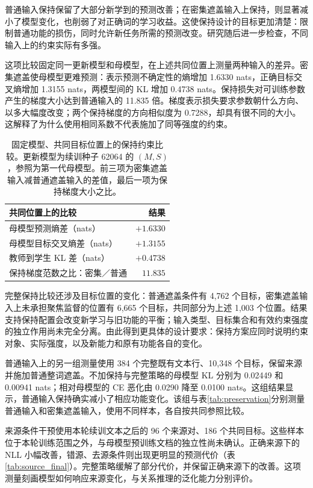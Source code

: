 普通输入保持保留了大部分新学到的预测改善；在密集遮盖输入上保持，则显著减小了模型变化，也削弱了对正确词的学习收益。这使保持设计的目标更加清楚：限制普通功能的损伤，同时允许新任务所需的预测改变。研究随后进一步检查，不同输入上的约束实际有多强。

这项比较固定同一更新模型和母模型，在上述共同位置上测量两种输入的差异。密集遮盖使母模型更难预测：表示预测不确定性的熵增加 1.6330 nats，正确目标交叉熵增加 1.3155 nats，两模型间的 KL 增加 0.4738 nats。保持损失对可训练参数产生的梯度大小达到普通输入的 11.835 倍。梯度表示损失要求参数朝什么方向、以多大幅度改变；两个保持梯度的方向相似度为 0.7288，却具有很不同的大小。这解释了为什么使用相同系数不代表施加了同等强度的约束。

\begin{table}[htbp]
\caption{固定模型、共同目标位置上的保持约束比较。更新模型为续训种子 62064 的 $(M,S)$，参照为第一代母模型。前三项为密集遮盖输入减普通遮盖输入的差值，最后一项为保持梯度大小之比。}
\label{tab:gradient_geometry}
\begin{tabularx}{\linewidth}{@{}Yr@{}}
\toprule 共同位置上的比较 & 结果\\\midrule
母模型预测熵差（nats） & $+1.6330$\\
母模型目标交叉熵差（nats） & $+1.3155$\\
教师到学生 KL 差（nats） & $+0.4738$\\
保持梯度范数之比：密集／普通 & $11.835$\\
\bottomrule
\end{tabularx}
\end{table}

完整保持比较还涉及目标位置的变化：普通遮盖条件有 4,762 个目标，密集遮盖输入上未承担聚焦监督的位置有 6,665 个目标，共同部分为上述 1,003 个位置。结果支持保持配置会改变新学习与旧功能的平衡；输入类型、目标集合和有效约束强度的独立作用尚未完全分离。由此得到更具体的设计要求：保持方案应同时说明约束对象、实际强度，以及新能力和原有功能各自的变化。

普通输入上的另一组测量使用 384 个完整既有文本行、10,348 个目标，保留来源并施加普通整词遮盖。不加保持与完整策略的母模型 KL 分别为 0.02449 和 0.00941 nats；相对母模型的 CE 恶化由 0.0290 降至 0.0100 nats。这组结果显示，普通输入保持确实减小了相应功能变化。该组与表\ref{tab:preservation}分别测量普通输入和密集遮盖输入，使用不同样本，各自按共同参照比较。

来源条件干预使用本轮续训文本之后的 96 个来源对、186 个共同目标。这些样本位于本轮训练范围之外，与母模型预训练文档的独立性尚未确认。正确来源下的 NLL 小幅改善，错源、去源条件则出现更明显的预测代价（表\ref{tab:source_final}）。完整策略缓解了部分代价，并保留正确来源下的改善。这项测量刻画模型如何响应来源变化，与关系推理的泛化能力分别评价。

